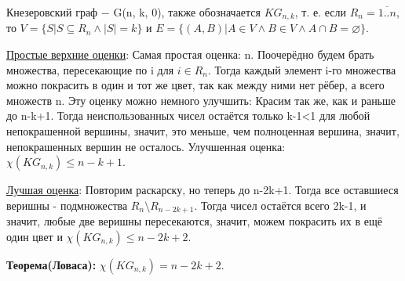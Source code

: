\Def Кнезеровский граф $-$ G(n, k, 0), также обозначается $KG_{n, k}$, т. е. если $R_n=\overline{1..n}$, то $V=\{ S | S \subseteq R_n\!\! \wedge\!\! |S| = k \}$ и $E=\{ (A, B) | A \in V\!\! \wedge\!\! B \in V\!\! \wedge\!\! A \cap B = \varnothing \}$.

\underline{Простые верхние оценки}: Самая простая оценка: n. Поочерёдно будем брать множества, пересекающие по i для $i \in R_n$. Тогда каждый элемент i-го множества можно покрасить в один и тот же цвет, так как между ними нет рёбер, а всего множеств n. Эту оценку можно немного улучшить: Красим так же, как и раньше до n-k+1. Тогда неиспользованных чисел остаётся только k-1<1 для любой непокрашенной вершины, значит, это меньше, чем полноценная вершина, значит, непокрашенных вершин не осталось. Улучшенная оценка: $\chi(KG_{n, k}) \leqslant n-k+1$.

\underline{Лучшая оценка}: Повторим раскарску, но теперь до n-2k+1. Тогда все оставшиеся веришны - подмножества $R_n \setminus R_{n-2k+1}$. Тогда чисел остаётся всего 2k-1, и значит, любые две веришны пересекаются, значит, можем покрасить их в ещё один цвет и $\chi(KG_{n, k}) \leqslant n-2k+2$.

\textbf{Теорема(Ловаса):} $\chi(KG_{n, k}) = n-2k+2$.